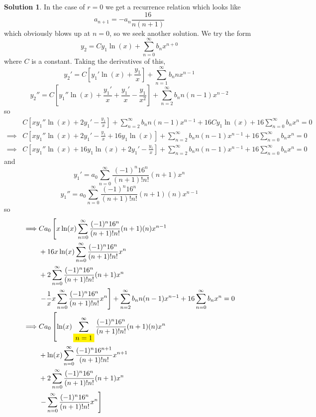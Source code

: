 \documentclass[10pt]{article}
\theoremstyle{definition}
\newtheorem{soln}{Solution}
\newcommand{\highlight}[1]{{\colorbox{yellow}{#1}}}
\begin{document}
\begin{soln}
  In the case of $r=0$ we get a recurrence relation which looks like
  $$a_{n+1} =-a_n\frac{16}{n(n+1)}$$
  which obviously blows up at $n=0$, so we seek another solution. We try the form
  $$y_2=Cy_1\ln(x)+\sum_{n=0}^{\infty}b_nx^{n+0}$$
  where $C$ is a constant. Taking the derivatives of this,
  $$y_2'=C\left[y_1'\ln(x)+\frac{y_1}{x}\right]+\sum_{n=1}^{\infty}b_nnx^{n-1}$$
  $$y_2''=C\left[y_1''\ln(x)+\frac{y_1'}{x}+\frac{y_1'}{x}-\frac{y_1}{x^2}\right]+\sum_{n=2}^{\infty}b_nn(n-1)x^{n-2}$$
  so
  \begin{align*}
             & C\left[xy_1''\ln(x)+2y_1'-\frac{y_1}{x}\right]+\sum_{n=2}^{\infty}b_nn(n-1)x^{n-1} + 16Cy_1\ln(x)+16\sum_{n=0}^{\infty}b_nx^{n} = 0 \\
    \implies & C\left[xy_1''\ln(x)+2y_1'-\frac{y_1}{x}+16y_1\ln(x)\right]+\sum_{n=2}^{\infty}b_nn(n-1)x^{n-1} +16\sum_{n=0}^{\infty}b_nx^{n} = 0   \\
    \implies & C\left[xy_1''\ln(x)+16y_1\ln(x)+2y_1'-\frac{y_1}{x}\right]+\sum_{n=2}^{\infty}b_nn(n-1)x^{n-1} +16\sum_{n=0}^{\infty}b_nx^{n} = 0
  \end{align*}
  and
  $$y_1'=a_0\sum_{n=0}^{\infty}\frac{(-1)^n16^n}{(n+1)!n!}(n+1)x^{n}$$
  $$y_1''=a_0\sum_{n=0}^{\infty}\frac{(-1)^n16^n}{(n+1)!n!}(n+1)(n)x^{n-1}$$
  so
  \begin{align*}
    \implies & Ca_0\left[x\ln(x)\sum_{n=0}^{\infty}\frac{(-1)^n16^n}{(n+1)!n!}(n+1)(n)x^{n-1}\right.            \\
             & +16x\ln(x)\sum_{n=0}^{\infty}\frac{(-1)^n16^n}{(n+1)!n!}x^{n}                                    \\
             & +2\sum_{n=0}^{\infty}\frac{(-1)^n16^n}{(n+1)!n!}(n+1)x^{n}                                       \\
             & \left.-\frac{1}{x}x\sum_{n=0}^{\infty}\frac{(-1)^n16^n}{(n+1)!n!}x^{n}\right]
    +\sum_{n=2}^{\infty}b_nn(n-1)x^{n-1}
    +16\sum_{n=0}^{\infty}b_nx^{n} =0                                                                           \\
    \implies & Ca_0\left[\ln(x)\sum_{\highlight{$n=1$}}^{\infty}\frac{(-1)^n16^n}{(n+1)!n!}(n+1)(n)x^{n}\right. \\
             & +\ln(x)\sum_{n=0}^{\infty}\frac{(-1)^n16^{n+1}}{(n+1)!n!}x^{n+1}                                 \\
             & +2\sum_{n=0}^{\infty}\frac{(-1)^n16^n}{(n+1)!n!}(n+1)x^{n}                                       \\
             & \left.-\sum_{n=0}^{\infty}\frac{(-1)^n16^n}{(n+1)!n!}x^{n}\right]

\end{align*}
\end{soln}
\end{document}
